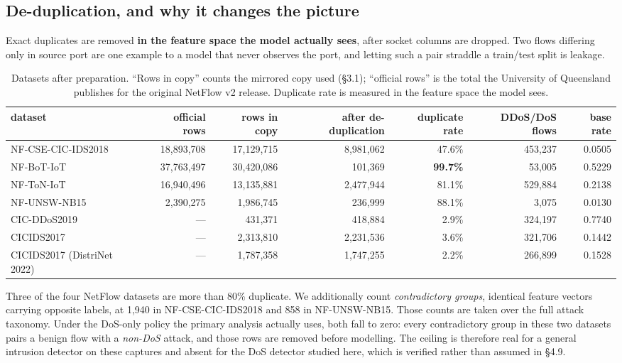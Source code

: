 \documentclass[11pt,a4paper]{article}
\begin{document}
\subsection{De-duplication, and why it changes the picture}

Exact duplicates are removed \textbf{in the feature space the model actually sees}, after socket columns are dropped. Two flows differing only in source port are one example to a model that never observes the port, and letting such a pair straddle a train/test split is leakage.

\begin{table}[htbp]\centering\small
\caption{Datasets after preparation. ``Rows in copy'' counts the mirrored copy used (§3.1); ``official rows'' is the total the University of Queensland publishes for the original NetFlow v2 release. Duplicate rate is measured in the feature space the model sees.}
\begin{tabularx}{\linewidth}{Xrrrrrr}
\toprule
dataset & official rows & rows in copy & after de-duplication & duplicate rate & DDoS/DoS flows & base rate \\
\midrule
NF-CSE-CIC-IDS2018 & 18,893,708 & 17,129,715 & 8,981,062 & 47.6\% & 453,237 & 0.0505 \\
NF-BoT-IoT & 37,763,497 & 30,420,086 & 101,369 & \textbf{99.7\%} & 53,005 & 0.5229 \\
NF-ToN-IoT & 16,940,496 & 13,135,881 & 2,477,944 & 81.1\% & 529,884 & 0.2138 \\
NF-UNSW-NB15 & 2,390,275 & 1,986,745 & 236,999 & 88.1\% & 3,075 & 0.0130 \\
CIC-DDoS2019 & --- & 431,371 & 418,884 & 2.9\% & 324,197 & 0.7740 \\
CICIDS2017 & --- & 2,313,810 & 2,231,536 & 3.6\% & 321,706 & 0.1442 \\
CICIDS2017 (DistriNet 2022) & --- & 1,787,358 & 1,747,255 & 2.2\% & 266,899 & 0.1528 \\
\bottomrule
\end{tabularx}
\end{table}

Three of the four NetFlow datasets are more than 80\% duplicate. We additionally count \emph{contradictory groups}, identical feature vectors carrying opposite labels, at 1,940 in NF-CSE-CIC-IDS2018 and 858 in NF-UNSW-NB15. Those counts are taken over the full attack taxonomy. Under the DoS-only policy the primary analysis actually uses, both fall to zero: every contradictory group in these two datasets pairs a benign flow with a \emph{non-DoS} attack, and those rows are removed before modelling. The ceiling is therefore real for a general intrusion detector on these captures and absent for the DoS detector studied here, which is verified rather than assumed in §4.9.
\end{document}
